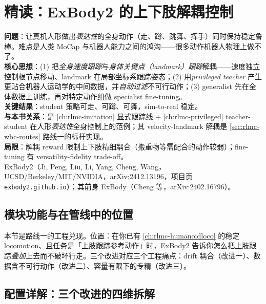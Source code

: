 \section{精读：ExBody2 的上下肢解耦控制}\label{sec:rlmc-wbc-exbody}

\begin{paper}\label{paper:rlmc-wbc-exbody2}
\textbf{问题}：让真机人形做出\emph{表达性}的全身动作（走、蹲、跳舞、挥手）同时保持稳定鲁棒。难点是人类 MoCap 与机器人能力之间的鸿沟——很多动作机器人物理上做不了。\\
\textbf{核心思想}：(1) 把\emph{全身速度跟踪}与\emph{身体关键点（landmark）跟踪}解耦——速度独立控制根节点移动、landmark 在局部坐标系跟踪姿态；(2) 用\emph{privileged teacher} 产生更贴合机器人运动学的中间数据，并\emph{自动过滤}不可行动作；(3) generalist 先在全体数据上训练，再对特定动作组做 specialist fine-tuning。\\
\textbf{关键结果}：student 策略可走、可蹲、可舞，sim-to-real 稳定。\\
\textbf{与本书关系}：是 \cref{ch:rlmc-imitation} 显式跟踪线 $+$ \cref{ch:rlmc-privileged} teacher-student 在人形\emph{表达性}全身控制上的范例；其 velocity-landmark 解耦是 \cref{sec:rlmc-wbc-routes} 路线一的标杆实现。\\
\textbf{局限}：解耦 reward 限制上下肢精细耦合（搬重物等需配合的动作较弱）；fine-tuning 有 versatility-fidelity trade-off。\\
ExBody2（Ji, Peng, Liu, Li, Yang, Cheng, Wang，UCSD/Berkeley/MIT/NVIDIA，arXiv:2412.13196，项目页 \texttt{exbody2.github.io}）\cite{ji2024exbody2}；其前身 ExBody（Cheng 等，arXiv:2402.16796）\cite{cheng2024exbody}。
\end{paper}

\subsection{模块功能与在管线中的位置}
本节是路线一的工程兑现。位置：在你已有 \cref{ch:rlmc-humanoidloco} 的稳定 locomotion、且任务是「上肢跟踪参考动作」时，ExBody2 告诉你怎么把上肢跟踪\emph{叠加}上去而不破坏行走。三个改进对应三个工程痛点：drift 耦合（改进一）、数据含不可行动作（改进二）、容量有限下的专精（改进三）。

\subsection{配置详解：三个改进的四维拆解}

